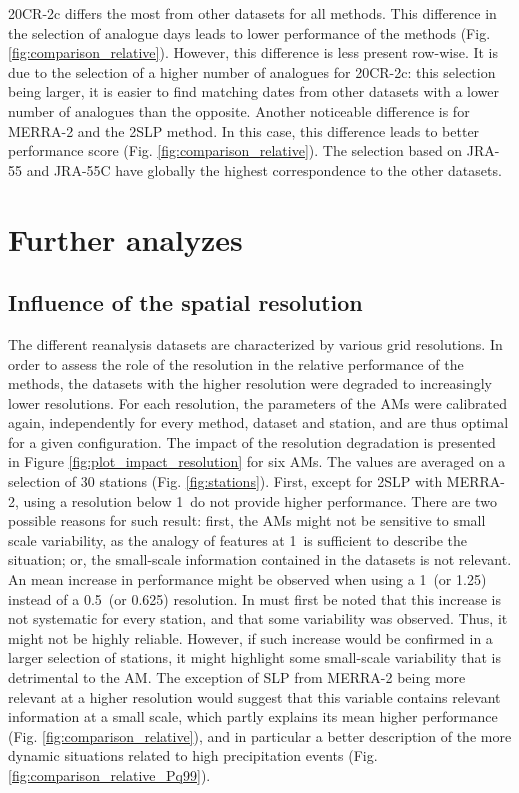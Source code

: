 \documentclass{ametsoc}
\begin{document}
20CR-2c differs the most from other datasets for all methods. This difference in the selection of analogue days leads to lower performance of the methods (Fig. \ref{fig:comparison_relative}). However, this difference is less present row-wise. It is due to the selection of a higher number of analogues for 20CR-2c: this selection being larger, it is easier to find matching dates from other datasets with a lower number of analogues than the opposite. Another noticeable difference is for MERRA-2 and the 2SLP method. In this case, this difference leads to better performance score (Fig. \ref{fig:comparison_relative}). The selection based on JRA-55 and JRA-55C have globally the highest correspondence to the other datasets.


\section{Further analyzes}
\label{sec:analyzes}

\subsection{Influence of the spatial resolution}
\label{sec:resolution}

The different reanalysis datasets are characterized by various grid resolutions. In order to assess the role of the resolution in the relative performance of the methods, the datasets with the higher resolution were degraded to increasingly lower resolutions. For each resolution, the parameters of the AMs were calibrated again, independently for every method, dataset and station, and are thus optimal for a given configuration. The impact of the resolution degradation is presented in Figure \ref{fig:plot_impact_resolution} for six AMs. The values are averaged on a selection of 30 stations (Fig. \ref{fig:stations}). First, except for 2SLP with MERRA-2, using a resolution below 1\degree\ do not provide higher performance. There are two possible reasons for such result: first, the AMs might not be sensitive to small scale variability, as the analogy of features at 1\degree\ is sufficient to describe the situation; or, the small-scale information contained in the datasets is not relevant. An mean increase in performance might be observed when using a 1\degree\ (or 1.25\degree) instead of a 0.5\degree\ (or 0.625\degree) resolution. In must first be noted that this increase is not systematic for every station, and that some variability was observed. Thus, it might not be highly reliable. However, if such increase would be confirmed in a larger selection of stations, it might highlight some small-scale variability that is detrimental to the AM. The exception of SLP from MERRA-2 being more relevant at a higher resolution would suggest that this variable contains relevant information at a small scale, which partly explains its mean higher performance (Fig. \ref{fig:comparison_relative}), and in particular a better description of the more dynamic situations related to high precipitation events (Fig. \ref{fig:comparison_relative_Pq99}).
\end{document}
